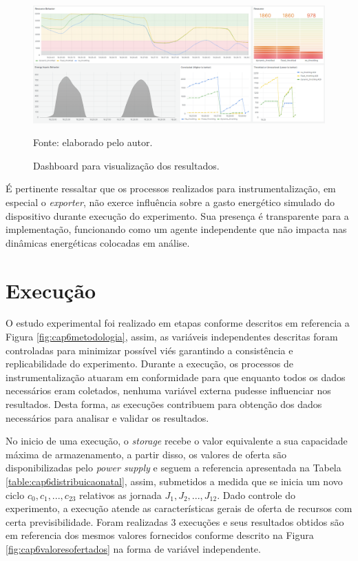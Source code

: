 \begin{figure}[H]
	\centering
	
	\caption{Dashboard para visualização dos resultados.}
	\label{fig:cap6bashboard}
	\noindent\includegraphics[width=1\linewidth]{Imagens/cap6/cap6dashboard.png} 
	
	Fonte: elaborado pelo autor.
\end{figure}

É pertinente ressaltar que os processos realizados para instrumentalização, em especial o \textit{exporter}, não exerce influência sobre a gasto energético simulado do dispositivo durante execução do experimento. Sua presença é transparente para a implementação, funcionando como um agente independente que não impacta nas dinâmicas energéticas colocadas em análise.

\section{Execução}
\label{cap6:execucao}

O estudo experimental foi realizado em etapas conforme descritos em referencia a Figura \ref{fig:cap6metodologia}, assim, as variáveis independentes descritas foram controladas para minimizar possível viés garantindo a consistência e replicabilidade do experimento. Durante a execução, os processos de instrumentalização atuaram em conformidade para que enquanto todos os dados necessários eram coletados, nenhuma variável externa pudesse influenciar nos resultados. Desta forma, as execuções contribuem para obtenção dos dados necessários para analisar e validar os resultados.

No inicio de uma execução, o \textit{storage} recebe o valor equivalente a sua capacidade máxima de armazenamento, a partir disso, os valores de oferta são disponibilizadas pelo \textit{power supply} e seguem a referencia apresentada na Tabela \ref{table:cap6distribuicaonatal}, assim, submetidos a medida que se inicia um novo ciclo $c_0, c_1,...,c_{23}$ relativos as jornada $J_1, J_2, ..., J_{12}$. Dado controle do experimento, a execução atende as características gerais de oferta de recursos com certa previsibilidade. Foram realizadas 3 execuções e seus resultados obtidos são em referencia dos mesmos valores fornecidos conforme descrito na Figura \ref{fig:cap6valoresofertados} na forma de variável independente.


